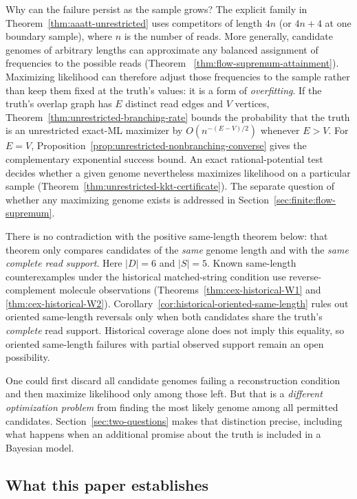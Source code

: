 Why can the failure persist as the sample grows? The explicit
family in Theorem~\ref{thm:aaatt-unrestricted} uses competitors
of length $4n$ (or $4n+4$ at one boundary sample), where
$n$ is the number of reads. More generally, candidate genomes
of arbitrary lengths can approximate any balanced assignment of
frequencies to the possible reads (Theorem~
\ref{thm:flow-supremum-attainment}). Maximizing likelihood can
therefore adjust those frequencies to the sample rather than keep
them fixed at the truth's values: it is a form of \emph{overfitting}.
If the truth's overlap graph has $E$ distinct read edges and
$V$ vertices, Theorem~\ref{thm:unrestricted-branching-rate}
bounds the probability that the truth is an unrestricted
exact-ML maximizer by $O(n^{-(E-V)/2})$ whenever $E>V$.
For $E=V$, Proposition~\ref{prop:unrestricted-nonbranching-converse}
gives the complementary exponential success bound.
An exact rational-potential test decides whether a given genome
nevertheless maximizes likelihood on a particular sample
(Theorem~\ref{thm:unrestricted-kkt-certificate}).
The separate question of whether any maximizing genome exists
is addressed in Section~\ref{sec:finite:flow-supremum}.

There is no contradiction with the positive same-length theorem below:
that theorem only compares candidates of the \emph{same} genome length
and with the \emph{same complete read support}. Here $|D|=6$ and
$|S|=5$. Known same-length counterexamples under the historical matched-string
condition use reverse-complement molecule observations
(Theorems~\ref{thm:cex-historical-W1} and
\ref{thm:cex-historical-W2}). Corollary~\ref{cor:historical-oriented-same-length}
rules out oriented same-length reversals only when both candidates
share the truth's \emph{complete} read support. Historical coverage
alone does not imply this equality, so oriented same-length failures
with partial observed support remain an open possibility.

One could first discard all candidate genomes failing a
reconstruction condition and then maximize likelihood only among
those left. But that is a \emph{different optimization problem}
from finding the most likely genome among all permitted candidates.
Section~\ref{sec:two-questions} makes that distinction precise,
including what happens when an additional promise about the truth
is included in a Bayesian model.

\subsection{What this paper establishes}

